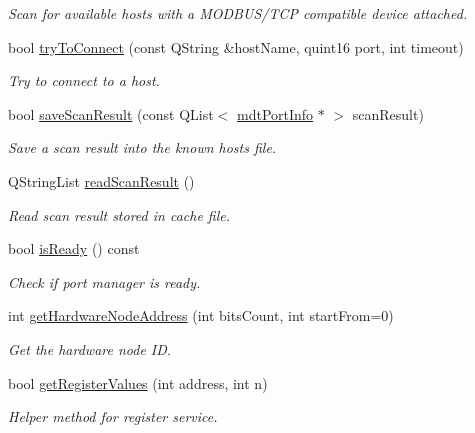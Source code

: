 \begin{DoxyCompactItemize}
\begin{DoxyCompactList}\small\item\em Scan for available hosts with a M\-O\-D\-B\-U\-S/\-T\-C\-P compatible device attached. \end{DoxyCompactList}\item 
bool \hyperlink{classmdt_modbus_tcp_port_manager_ab04f69b660487a7c59d309df7a8f5baa}{try\-To\-Connect} (const Q\-String \&host\-Name, quint16 port, int timeout)
\begin{DoxyCompactList}\small\item\em Try to connect to a host. \end{DoxyCompactList}\item 
bool \hyperlink{classmdt_modbus_tcp_port_manager_a3a1f5a54c93fa90ba83dea8785407da3}{save\-Scan\-Result} (const Q\-List$<$ \hyperlink{classmdt_port_info}{mdt\-Port\-Info} $\ast$ $>$ scan\-Result)
\begin{DoxyCompactList}\small\item\em Save a scan result into the known hosts file. \end{DoxyCompactList}\item 
Q\-String\-List \hyperlink{classmdt_modbus_tcp_port_manager_ab4d0a994973af6008faf489ca9ddb03d}{read\-Scan\-Result} ()
\begin{DoxyCompactList}\small\item\em Read scan result stored in cache file. \end{DoxyCompactList}\item 
bool \hyperlink{classmdt_modbus_tcp_port_manager_a5477eb7e8d57c5a42004046b426e39b6}{is\-Ready} () const 
\begin{DoxyCompactList}\small\item\em Check if port manager is ready. \end{DoxyCompactList}\item 
int \hyperlink{classmdt_modbus_tcp_port_manager_a4f52a477c264f809984e25abbc856db8}{get\-Hardware\-Node\-Address} (int bits\-Count, int start\-From=0)
\begin{DoxyCompactList}\small\item\em Get the hardware node I\-D. \end{DoxyCompactList}\item 
bool \hyperlink{classmdt_modbus_tcp_port_manager_ab5e780409492b5f56326a870bc4262ec}{get\-Register\-Values} (int address, int n)
\begin{DoxyCompactList}\small\item\em Helper method for register service. \end{DoxyCompactList}\item 

\end{DoxyCompactItemize}

